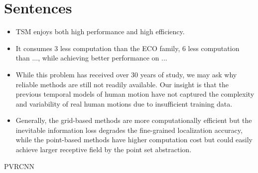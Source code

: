 \section{Sentences}

\begin{itemize}
  \item TSM enjoys both high performance and high efficiency.
  \item It consumes 3  less computation than the ECO family, 6  less computation than ..., while achieving better performance on ...
  \item While this problem has received over 30 years of study, we may ask why reliable methods are still not readily available. Our insight is that the previous temporal models of human motion have not captured the complexity and variability of real human motions due to insufficient training data.
  \item Generally, the grid-based methods are more computationally efficient but the inevitable information loss degrades the fine-grained localization accuracy, while the point-based methods have higher computation cost but could easily achieve larger receptive field by the point set abstraction.
\end{itemize}

PVRCNN \cite{}



